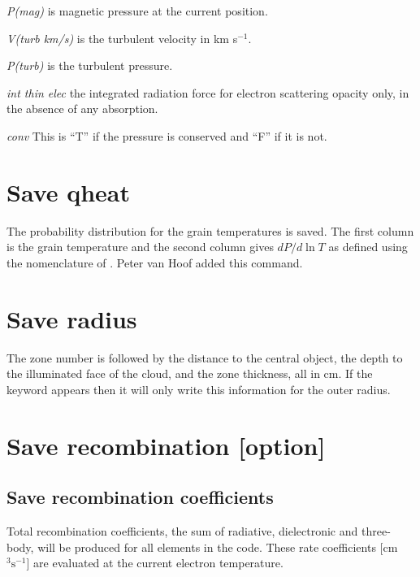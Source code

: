 \begin{description}
\item \emph{P(mag)} is magnetic pressure at the current position.

\item \emph{V(turb km/s)} is the turbulent velocity in km s$^{-1}$.

\item \emph{P(turb)} is the turbulent pressure.

\item \emph{int thin elec} the integrated radiation force
for electron scattering opacity only, in the absence of
any absorption.

\item  \emph{conv} This is ``T'' if the pressure is conserved and ``F'' if it is not.
\end{description}

\section{Save qheat}

The probability distribution for the grain temperatures is saved.
The first column is the grain temperature and the second column gives
$dP/d\ln T$ as defined using the nomenclature of \citet{Guhathakurta1989}.
Peter van Hoof added this command.

\section{Save radius}

The zone number is followed by the distance to the central object, the
depth to the illuminated face of the cloud, and the zone thickness, all
in cm.  If the keyword  appears then it will only write this information
for the outer radius.

\section{Save recombination [option]}

\subsection{Save recombination coefficients}

Total recombination coefficients, the sum of radiative, dielectronic
and three-body, will be produced for all elements in the code.  These rate
coefficients [cm$^3 \mathrm{s}^{-1}$] are evaluated at the current electron temperature.

